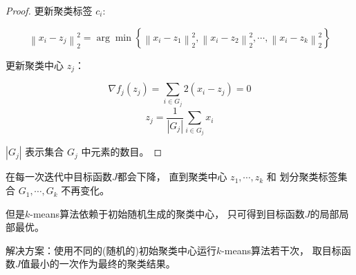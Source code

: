 \begin{proof}
    更新聚类标签 $ c_{i} $:

    \begin{equation} \left\|x_{i}-z_{j}\right\|_{2}^{2}=\arg \min \left\{\left\|x_{i}-z_{1}\right\|_{2}^{2},\left\|x_{i}-z_{2}\right\|_{2}^{2}, \cdots,\left\|x_{i}-z_{k}\right\|_{2}^{2}\right\} \end{equation}

    更新聚类中心 $ z_{j} $：

    \begin{equation} \nabla f_{j}\left(z_{j}\right)=\sum_{i \in G_{j}} 2\left(x_{i}-z_{j}\right)=0 \end{equation}
\begin{equation} z_{j}=\frac{1}{\left|G_{j}\right|} \sum_{i \in G_{j}} x_{i} \end{equation}

$ \left|G_{j}\right| $ 表示集合 $ G_{j} $ 中元素的数目。 
\end{proof}

在每一次迭代中目标函数$J$都会下降， 直到聚类中心 $ z_{1}, \cdots, z_{k} $ 和 划分聚类标签集合 $ G_{1}, \cdots, G_{k} $ 不再变化。 

但是$k$-means算法依赖于初始随机生成的聚类中心， 只可得到目标函数$J$的局部局部最优。 

解决方案：使用不同的(随机的)初始聚类中心运行$k$-means算法若干次， 取目标函数$J$值最小的一次作为最终的聚类结果。 

